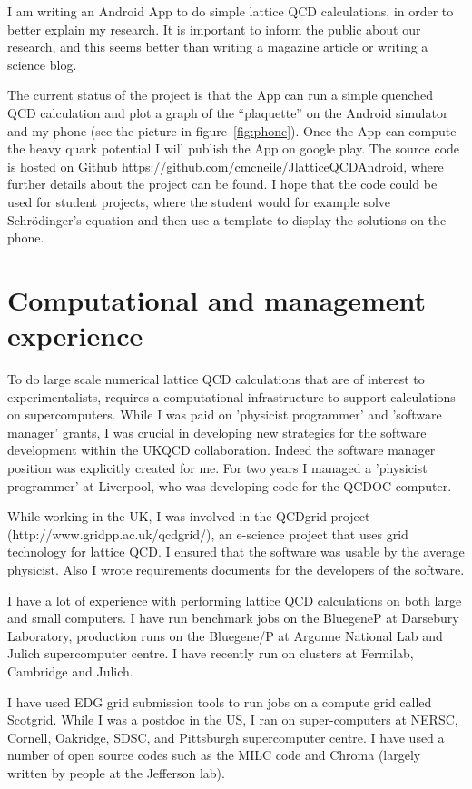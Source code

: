 \documentclass[12pt]{article}
\begin{document}
I am writing an Android App to do simple lattice QCD calculations,
in order to better explain my research. It is important to inform
the public about our research, and this seems better than 
writing a magazine article or writing a science blog.

The current status of the project is that the App
can run a simple quenched QCD calculation and 
plot a graph of the ``plaquette'' on the 
Android simulator and my 
phone (see the picture in figure~\ref{fig:phone}).
Once the App can compute the heavy quark potential 
I will publish the App on google play.
The source code is hosted on Github 
\url{https://github.com/cmcneile/JlatticeQCDAndroid},
where further details about the project can be found.
I hope that the code could be used for student projects,
where the student would for example solve Schr\"{o}dinger's
equation and then use a template to display the solutions 
on the phone.


\section{Computational and management experience}

To do large scale numerical lattice QCD calculations that are of
interest to experimentalists, requires a computational infrastructure
to support calculations on supercomputers.  While I was paid on
'physicist programmer' and 'software manager' grants, I was crucial in
developing new strategies for the software development within the 
UKQCD collaboration.
Indeed the software manager position was explicitly created for me.
For two years I managed a 'physicist programmer' at Liverpool, who
was developing code for the QCDOC computer. 

While working in the UK, I was involved in the 
QCDgrid project (http://www.gridpp.ac.uk/qcdgrid/), 
an e-science project that
uses grid technology for lattice QCD.  I ensured that the software was
usable by the average physicist. Also I wrote requirements
documents for the developers of the software.

I have a lot of experience with performing lattice QCD calculations on
both large and small computers. 
I have run benchmark jobs on the 
BluegeneP at Darsebury Laboratory, production runs on
the Bluegene/P at Argonne National Lab and Julich supercomputer centre.
I have recently run on 
clusters at Fermilab, Cambridge and Julich.

I have
used EDG grid submission tools to run jobs on a compute grid
called Scotgrid.  While I was a postdoc in the US, I ran on
super-computers at NERSC, Cornell, Oakridge, SDSC, and Pittsburgh
supercomputer centre. I have used a number of open source codes such
as the MILC code and Chroma (largely written by people at the
Jefferson lab).
\end{document}
